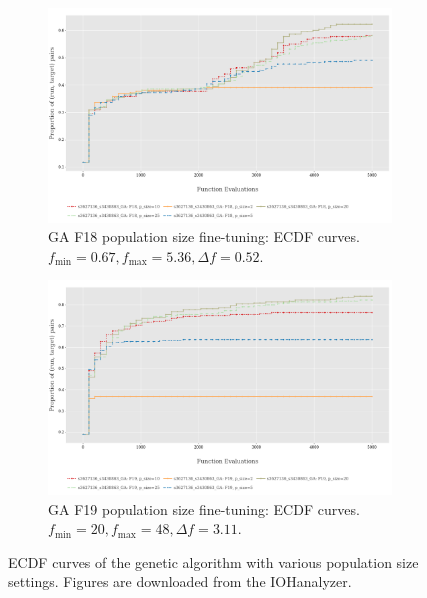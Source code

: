 \documentclass{article}
\begin{document}
\begin{figure}[!ht]
    \begin{subfigure}[h]{0.95\linewidth}
        \includegraphics[width=\linewidth]{ga/f18/psize_ecdf.png}
        \caption{GA F18 population size fine-tuning: ECDF curves. $f_{\min} = 0.67, f_{\max} = 5.36, \Delta f = 0.52$.}
    \end{subfigure}
    \hfill
    \begin{subfigure}[h]{0.95\linewidth}
        \includegraphics[width=\linewidth]{ga/f19/psize_ecdf.png}
        \caption{GA F19 population size fine-tuning: ECDF curves. $f_{\min} = 20, f_{\max} = 48, \Delta f = 3.11$.}
    \end{subfigure}
    \caption{ECDF curves of the genetic algorithm with various population size settings. Figures are downloaded from the IOHanalyzer.}
    \label{fig:experi-ga-psize-ecdf}
\end{figure}
\end{document}
